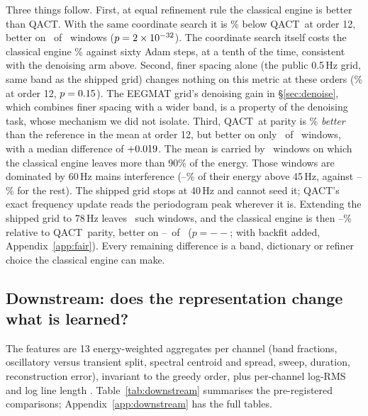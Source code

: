 \documentclass{article}
\providecommand{\fairDriftFailTwelve}{--}\providecommand{\fairDriftOKTwelve}{--}
\providecommand{\fairLowVsParityRelTwelve}{--}\providecommand{\fairLowVsParityBetterTwelve}{--}\providecommand{\fairLowVsParityPTwelve}{--}
\newcommand{\qact}{QACT}
\begin{document}
Three things follow. First, at equal refinement rule the classical engine is better than \qact. With the same coordinate search it is \fairCoordVsHwRelTwelve\% below \qact\ at order 12, better on \fairCoordVsHwBetterTwelve\ of \fairN\ windows ($p=2\times10^{-32}$). The coordinate search itself costs the classical engine \fairClCoordRelTwelve\% against sixty Adam steps, at a tenth of the time, consistent with the denoising arm above. Second, finer spacing alone (the public 0.5\,Hz grid, same band as the shipped grid) changes nothing on this metric at these orders (\fairClFineAdamRelTwelve\% at order 12, $p=0.15$). The EEGMAT grid's denoising gain in \S\ref{sec:denoise}, which combines finer spacing with a wider band, is a property of the denoising task, whose mechanism we did not isolate. Third, \qact\ at parity is \fairQParityRelTwelve\% \emph{better} than the reference in the mean at order 12, but better on only \fairQParityBetterTwelve\ of \fairN\ windows, with a median difference of $+0.019$. The mean is carried by \fairRefFailTwelve\ windows on which the classical engine leaves more than 90\% of the energy. Those windows are dominated by 60\,Hz mains interference (\fairDriftFailTwelve\% of their energy above 45\,Hz, against \fairDriftOKTwelve\% for the rest). The shipped grid stops at 40\,Hz and cannot seed it; \qact's exact frequency update reads the periodogram peak wherever it is. Extending the shipped grid to 78\,Hz leaves \fairLowFailTwelve\ such windows, and the classical engine is then \fairLowVsParityRelTwelve\% relative to \qact\ parity, better on \fairLowVsParityBetterTwelve\ of \fairN\ ($p=\fairLowVsParityPTwelve$; with backfit added, Appendix~\ref{app:fair}). Every remaining difference is a band, dictionary or refiner choice the classical engine can make.

\subsection{Downstream: does the representation change what is learned?}
\label{sec:downstream}
The features are 13 energy-weighted aggregates per channel (band fractions, oscillatory versus transient split, spectral centroid and spread, sweep, duration, reconstruction error), invariant to the greedy order, plus per-channel log-RMS and log line length \citep{esteller2001line}. Table~\ref{tab:downstream} summarises the pre-registered comparisons; Appendix~\ref{app:downstream} has the full tables.
\end{document}
